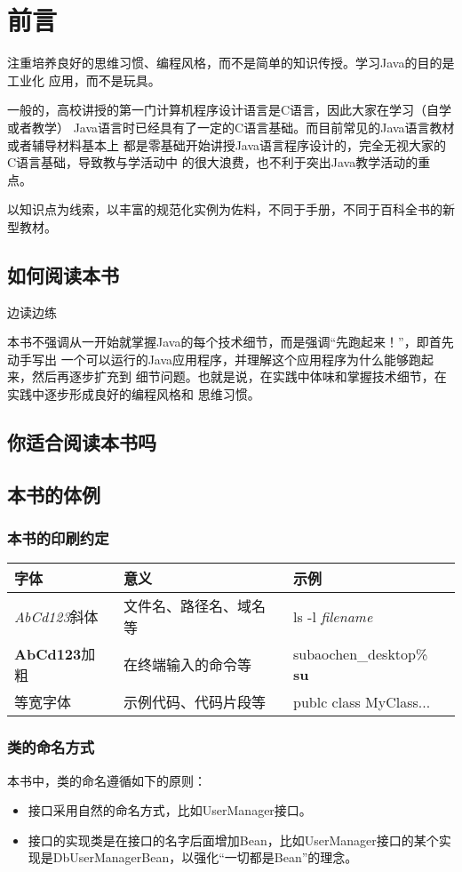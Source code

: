 \frontmatter
\chapter{前言}
注重培养良好的思维习惯、编程风格，而不是简单的知识传授。学习Java的目的是工业化
应用，而不是玩具。

一般的，高校讲授的第一门计算机程序设计语言是C语言，因此大家在学习（自学或者教学）
Java语言时已经具有了一定的C语言基础。而目前常见的Java语言教材或者辅导材料基本上
都是零基础开始讲授Java语言程序设计的，完全无视大家的C语言基础，导致教与学活动中
的很大浪费，也不利于突出Java教学活动的重点。

以知识点为线索，以丰富的规范化实例为佐料，不同于手册，不同于百科全书的新型教材。

\section*{如何阅读本书}
边读边练

本书不强调从一开始就掌握Java的每个技术细节，而是强调“先跑起来！”，即首先动手写出
一个可以运行的Java应用程序，并理解这个应用程序为什么能够跑起来，然后再逐步扩充到
细节问题。也就是说，在实践中体味和掌握技术细节，在实践中逐步形成良好的编程风格和
思维习惯。

\section*{你适合阅读本书吗}
\section*{本书的体例}
\subsection*{本书的印刷约定}
\begin{tabular}{|l|l|l|}
    \hline
    字体 & 意义 & 示例 \\
    \hline
    \textsl{AbCd123}斜体 & 文件名、路径名、域名等 & ls -l \textsl{filename}\\
    \hline
    \textbf{AbCd123}加粗 & 在终端输入的命令等 & subaochen\_desktop\% \textbf{su} \\
    \hline
    等宽字体 & 示例代码、代码片段等 & publc class MyClass... \\
    \hline

\end{tabular}

\subsection*{类的命名方式}
本书中，类的命名遵循如下的原则：
\begin{itemize}
    \item 接口采用自然的命名方式，比如UserManager接口。
    \item 接口的实现类是在接口的名字后面增加Bean，比如UserManager接口的某个实现是DbUserManagerBean，以强化“一切都是Bean”的理念。
\end{itemize}
